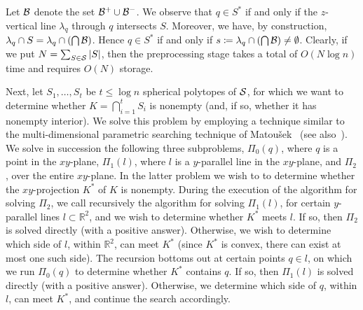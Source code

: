 \documentclass[a4paper,12pt]{article}
\def\B{{\cal B}}
\def\S{{\cal S}}
\begin{document}
Let $\B$ denote the set $\B^+ \cup \B^-$. We observe that $q \in
S^*$ if and only if the $z$-vertical line $\lambda_q$ through $q$
intersects $S$. Moreover, we have, by construction, $\lambda_q \cap
S = \lambda_q \cap (\bigcap \B)$. Hence $q \in S^*$ if and only if
$s \coloneqq \lambda_q \cap (\bigcap \B) \neq \emptyset$. Clearly,
if we put $N = \sum_{S \in \S} |S|$, then the preprocessing stage
takes a total of $O(N \log n)$ time and requires $O(N)$ storage.

Next, let $S_1,\ldots,S_t$ be $t \leq \log n$ spherical polytopes of
$\S$, for which we want to determine whether $K = \bigcap_{i=1}^t
S_i$ is nonempty (and, if so, whether it has nonempty interior). We
solve this problem by employing a technique similar to the
multi-dimensional parametric searching technique of
Matou\v{s}ek~\cite{JM} (see also~\cite{AES, TCA, CMS, NPT}). We
solve in succession the following three subproblems, $\Pi_0(q)$,
where $q$ is a point in the $xy$-plane, $\Pi_1(l)$, where $l$ is a
$y$-parallel line in the $xy$-plane, and $\Pi_2$, over the entire
$xy$-plane. In the latter problem we wish to to determine whether
the $xy$-projection $K^*$ of $K$ is nonempty. During the execution
of the algorithm for solving $\Pi_2$, we call recursively the
algorithm for solving $\Pi_1(l)$, for certain $y$-parallel lines $l
\subset \mathbb{R}^2$, and we wish to determine whether $K^*$ meets
$l$. If so, then $\Pi_2$ is solved directly (with a positive
answer). Otherwise, we wish to determine which side of $l$, within
$\mathbb{R}^2$, can meet $K^*$ (since $K^*$ is convex, there can
exist at most one such side). The recursion bottoms out at certain
points $q \in l$, on which we run $\Pi_0(q)$ to determine whether
$K^*$ contains $q$. If so, then $\Pi_1(l)$ is solved directly (with
a positive answer). Otherwise, we determine which side of $q$,
within $l$, can meet $K^*$, and continue the search accordingly.
\end{document}

